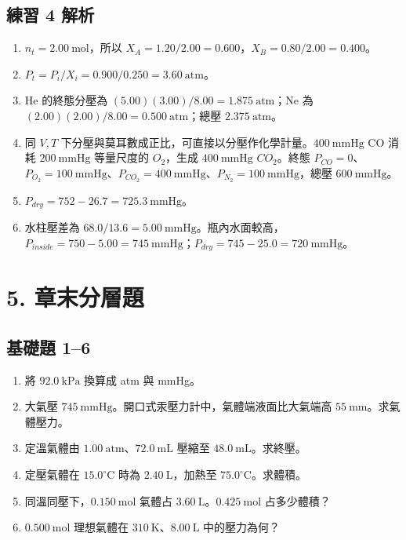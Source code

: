 \documentclass[11pt,a4paper]{article}
\providecommand{\tightlist}{%
  \setlength{\itemsep}{0pt}\setlength{\parskip}{0pt}}
\begin{document}
\subsection{練習 4 解析}\label{ux7df4ux7fd2-4-ux89e3ux6790}

\begin{enumerate}
\def\labelenumi{\arabic{enumi}.}
\tightlist
\item
  \(n_t=2.00\ \mathrm{mol}\)，所以 \(X_A=1.20/2.00=0.600\)，\(X_B=0.80/2.00=0.400\)。
\item
  \(P_t=P_i/X_i=0.900/0.250=3.60\ \mathrm{atm}\)。
\item
  He 的終態分壓為 \((5.00)(3.00)/8.00=1.875\ \mathrm{atm}\)；Ne 為 \((2.00)(2.00)/8.00=0.500\ \mathrm{atm}\)；總壓 \(2.375\ \mathrm{atm}\)。
\item
  同 \(V,T\) 下分壓與莫耳數成正比，可直接以分壓作化學計量。\(400\ \mathrm{mmHg}\) CO 消耗 \(200\ \mathrm{mmHg}\) 等量尺度的 \(O_2\)，生成 \(400\ \mathrm{mmHg}\) \(CO_2\)。終態 \(P_{CO}=0\)、\(P_{O_2}=100\ \mathrm{mmHg}\)、\(P_{CO_2}=400\ \mathrm{mmHg}\)、\(P_{N_2}=100\ \mathrm{mmHg}\)，總壓 \(600\ \mathrm{mmHg}\)。
\item
  \(P_{dry}=752-26.7=725.3\ \mathrm{mmHg}\)。
\item
  水柱壓差為 \(68.0/13.6=5.00\ \mathrm{mmHg}\)。瓶內水面較高，\(P_{inside}=750-5.00=745\ \mathrm{mmHg}\)；\(P_{dry}=745-25.0=720\ \mathrm{mmHg}\)。
\end{enumerate}

\section{5. 章末分層題}\label{ux7ae0ux672bux5206ux5c64ux984c}

\subsection{基礎題 1--6}\label{ux57faux790eux984c-16}

\begin{enumerate}
\def\labelenumi{\arabic{enumi}.}
\tightlist
\item
  將 \(92.0\ \mathrm{kPa}\) 換算成 atm 與 mmHg。
\item
  大氣壓 \(745\ \mathrm{mmHg}\)。開口式汞壓力計中，氣體端液面比大氣端高 \(55\ \mathrm{mm}\)。求氣體壓力。
\item
  定溫氣體由 \(1.00\ \mathrm{atm}\)、\(72.0\ \mathrm{mL}\) 壓縮至 \(48.0\ \mathrm{mL}\)。求終壓。
\item
  定壓氣體在 \(15.0^\circ\mathrm C\) 時為 \(2.40\ \mathrm L\)，加熱至 \(75.0^\circ\mathrm C\)。求體積。
\item
  同溫同壓下，\(0.150\ \mathrm{mol}\) 氣體占 \(3.60\ \mathrm L\)。\(0.425\ \mathrm{mol}\) 占多少體積？
\item
  \(0.500\ \mathrm{mol}\) 理想氣體在 \(310\ \mathrm K\)、\(8.00\ \mathrm L\) 中的壓力為何？
\end{enumerate}
\end{document}
